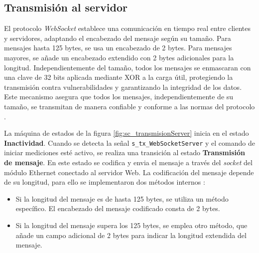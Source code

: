 \subsection{Transmisión al servidor}

El protocolo \textit{WebSocket} establece una comunicación en tiempo real entre clientes y servidores, adaptando el encabezado del mensaje según su tamaño. Para mensajes hasta 125 bytes, se usa un encabezado de 2 bytes. Para mensajes mayores, se añade un encabezado extendido con 2 bytes adicionales para la longitud. Independientemente del tamaño, todos los mensajes se enmascaran con una clave de 32 bits aplicada mediante XOR a la carga útil, protegiendo la transmisión contra vulnerabilidades y garantizando la integridad de los datos. Este mecanismo asegura que todos los mensajes, independientemente de su tamaño, se transmitan de manera confiable y conforme a las normas del protocolo \cite{websockeWiki}. 



La máquina de estados de la figura \ref{fig:sc_transmisionServer} inicia en el estado \textbf{Inactividad}. Cuando se detecta la señal \texttt{s\_tx\_WebSocketServer} y el comando de iniciar mediciones esté activo, se realiza una transición al estado \textbf{Transmisión de mensaje}. En este estado se codifica y envia el mensaje a través del \textit{socket} del módulo Ethernet conectado al servidor Web. La codificación del mensaje depende de su longitud, para ello se implementaron dos métodos internos \cite{FirmwareSCA2024}:
\begin{itemize}
  \item Si la longitud del mensaje es de hasta 125 bytes, se utiliza un método específico. El encabezado del mensaje codificado consta de 2 bytes.
  \item Si la longitud del mensaje supera los 125 bytes, se emplea otro método, que añade un campo adicional de 2 bytes para indicar la longitud extendida del mensaje.
\end{itemize}


